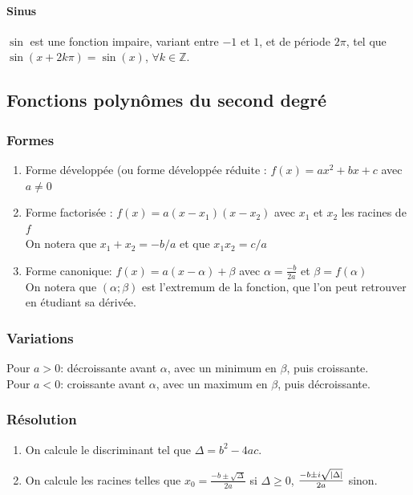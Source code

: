 \documentclass{article}
\begin{document}
\paragraph{Sinus}
$\sin$ est une fonction impaire, variant entre $-1$ et $1$, et de période $2\pi$, tel que $\sin(x + 2k\pi) = \sin(x)$, $\forall k \in \mathbb{Z}$.


\subsection{Fonctions polynômes du second degré}

\subsubsection{Formes}
\begin{enumerate}
	\item Forme développée (ou forme développée réduite : $f(x) = ax^2+bx+c$ avec $a \neq 0$
	\item Forme factorisée : $f(x) = a(x - x_1)(x - x_2)$ avec $x_1$ et $x_2$ les racines de $f$\\
	      On notera que $x_1+x_2=-b/a$ et que $x_1x_2=c/a$
	\item Forme canonique: $f(x) = a(x-\alpha)+\beta$ avec $\alpha = \frac{-b}{2a}$ et $\beta = f(\alpha)$\\
	      On notera que $(\alpha;\beta)$ est l'extremum de la fonction, que l'on peut retrouver en étudiant sa dérivée.
\end{enumerate}

\subsubsection{Variations}
Pour $a > 0$: décroissante avant $\alpha$, avec un minimum en $\beta$, puis croissante.\\
Pour $a < 0$: croissante avant $\alpha$, avec un maximum en $\beta$, puis décroissante.

\subsubsection{Résolution}
\begin{enumerate}
	\item On calcule le discriminant tel que $\Delta = b^2 - 4ac$.
	\item On calcule les racines telles que $x_0 = \frac{-b \pm \sqrt{\Delta}}{2a}$ si $\Delta \ge 0$, $\frac{-b \pm i\sqrt{\abs{\Delta}}}{2a}$ sinon.
\end{enumerate}
\end{document}
